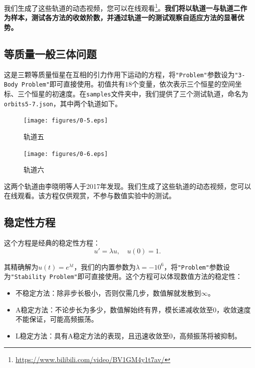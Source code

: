 \documentclass[lang=cn,10pt,bibend=bibtex]{elegantbook}
\begin{document}
我们生成了这些轨道的动态视频，您可以在线观看\footnote{\url{https://www.bilibili.com/video/BV1GM4y1t7av/}\label{fn:视频}}。\textbf{我们将以轨道一与轨道二作为样本，测试各方法的收敛阶数，并通过轨道一的测试观察自适应方法的显著优势。}

\subsection{等质量一般三体问题}

这是三颗等质量恒星在互相的引力作用下运动的方程，将\verb|"Problem"|参数设为\verb|"3-Body Problem"|即可直接使用。初值共有$18$个变量，依次表示三个恒星的空间坐标、三个恒星的初速度。在\verb|samples|文件夹中，我们提供了三个测试轨道，命名为\verb|orbits5-7.json|，其中两个轨道如下。

\begin{figure}[H]
  \centering
  \begin{minipage}[t]{0.42\linewidth}
    \centering
    \texttt{[image: figures/0-5.eps]}
    \caption*{\small 轨道五}
  \end{minipage}
  \hspace{2em}
  \begin{minipage}[t]{0.42\linewidth}
      \centering
      \texttt{[image: figures/0-6.eps]}
      \caption*{\small 轨道六}
  \end{minipage}
\end{figure}

这两个轨道由李晓明等人于2017年发现\cite{XiaoMing2017More}。我们生成了这些轨道的动态视频，您可以在线观看。该方程仅供观赏，不参与数值实验中的测试。

\subsection{稳定性方程}

这个方程是经典的稳定性方程：
\begin{equation}
  u'=\lambda u,\quad u(0)=1.
\end{equation}

其精确解为$u(t)=e^{\lambda t}$，我们的内置参数为$\lambda=-10^{6}$，将\verb|"Problem"|参数设为\verb|"Stability Problem"|即可直接使用。这个方程可以体现数值方法的稳定性：

\begin{itemize}
  \item 不稳定方法：除非步长极小，否则仅需几步，数值解就发散到$\infty$。
  \item A稳定方法：不论步长为多少，数值解始终有界，模长递减收敛至$0$，收敛速度不能保证，可能高频振荡。
  \item L稳定方法：具有A稳定方法的表现，且迅速收敛至$0$，高频振荡将被抑制。
\end{itemize}
\end{document}
